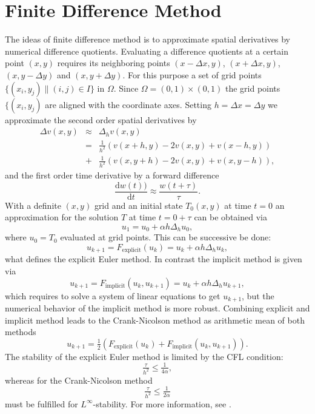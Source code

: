 \documentclass[a4paper,11pt]{article}
\begin{document}
\section{Finite Difference Method}
The ideas of finite difference method is to approximate spatial derivatives by numerical difference quotients. Evaluating a difference quotients at a certain point $(x,y)$ requires its neighboring points $(x-\Delta x,y)$, $(x+\Delta x,y)$, $(x,y-\Delta y)$ and $(x,y+\Delta y)$. For this purpose a set of grid points $\{ (x_i, y_j) \| (i,j) \in I\} $ in $\Omega $. Since $\Omega = ( 0,1 ) \times ( 0,1 ) $ the grid points $\{ (x_i, y_j) $ are aligned with the coordinate axes.
Setting $ h= \Delta x = \Delta y $ we approximate the second order spatial derivatives by
\begin{eqnarray*}
\Delta v(x,y) & \approx & \Delta_h v(x,y) \\
 & = & \frac{1}{h^2}\left(v(x+h, y) -2 v(x,y) + v(x-h,y) \right) \\
& + & \frac{1}{h^2}\left( v(x, y+h) -2 v(x,y) + v(x,y-h) \right),
\end{eqnarray*}
and the first order time derivative by a forward difference
\begin{equation*}
\frac{\mathrm{d} w(t) )}{\mathrm{d} t } \approx \frac{w(t+\tau )}{\tau } .
\end{equation*}
With a definite $(x,y)$ grid and an initial state $T_0 (x,y) $ at time $t=0$ an approximation for the solution $T$ at time $t= 0 +\tau $ can be obtained via
\begin{equation*}
u_1 = u_0 + \alpha h\Delta_h u_0,
\end{equation*}
where $ u_0 = T_0 $ evaluated at grid points. This can be successive be done:
\begin{equation*}
u_{k+1} = F_{\mathrm{explicit}} (u_k) = u_k + \alpha h \Delta_h u_k,
\end{equation*}
what defines the explicit Euler method. In contrast the implicit method is given via
\begin{equation*}
u_{k+1} = F_{\mathrm{implicit}} (u_k, u_{k+1}) =u_k + \alpha h \Delta_h u_{k+1},
\end{equation*}
which requires to solve a system of linear equations to get $u_{k+1} $, but the numerical behavior of the implicit method is more robust.
Combining explicit and implicit method leads to the Crank-Nicolson method as arithmetic mean of both methods
\begin{equation*}
u_{k+1} = \tfrac{1}{2}\left(  F_{\mathrm{explicit}} (u_k)  + F_{\mathrm{implicit}} (u_k, u_{k+1})  \right) .
\end{equation*}
The stability of the explicit Euler method is limited by the CFL condition:
\begin{equation*}
\tfrac{\tau }{h^2 } \leq \tfrac{1}{4\alpha }, 
\end{equation*}
whereas for the Crank-Nicolson method
\begin{equation*}
\tfrac{\tau }{h^2 } \leq \tfrac{1}{2\alpha }
\end{equation*}
must be fulfilled for $L^\infty $-stability. For more information, see \cite[p 112]{Ernst2015}.
\end{document}
